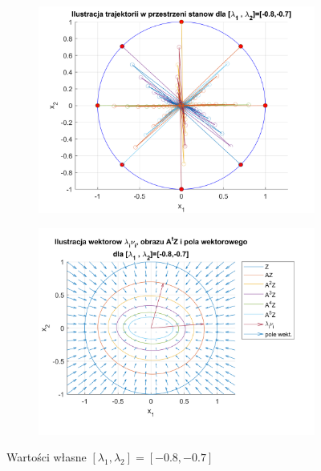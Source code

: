 \documentclass{article}
\begin{document}
\begin{figure}[H]
    \centering
    \begin{subfigure}{0.44\textwidth}
        \includegraphics[width=\textwidth]{portret_fazowy_-8_-7.png}
    \end{subfigure}
    \begin{subfigure}{0.48\textwidth}
        \includegraphics[width=\textwidth]{pole_wektorowe_-8_-7.png}
    \end{subfigure}
    \caption{Warto\'sci własne $[ \lambda_1, \lambda_2 ]= [ -0.8, -0.7 ]$}
    \label{fig::-8i-7}
\end{figure}
\end{document}
